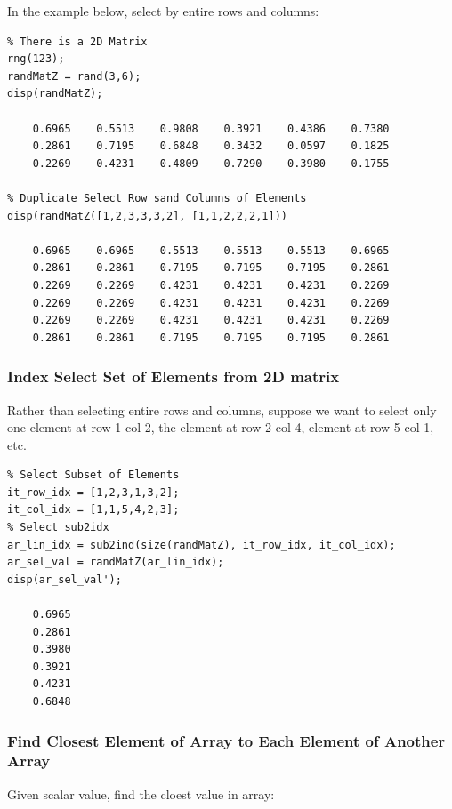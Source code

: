 \documentclass[
]{book}
\begin{document}
In the example below, select by entire rows and columns:

\begin{verbatim}
% There is a 2D Matrix
rng(123);
randMatZ = rand(3,6);
disp(randMatZ);

    0.6965    0.5513    0.9808    0.3921    0.4386    0.7380
    0.2861    0.7195    0.6848    0.3432    0.0597    0.1825
    0.2269    0.4231    0.4809    0.7290    0.3980    0.1755

% Duplicate Select Row sand Columns of Elements
disp(randMatZ([1,2,3,3,3,2], [1,1,2,2,2,1]))

    0.6965    0.6965    0.5513    0.5513    0.5513    0.6965
    0.2861    0.2861    0.7195    0.7195    0.7195    0.2861
    0.2269    0.2269    0.4231    0.4231    0.4231    0.2269
    0.2269    0.2269    0.4231    0.4231    0.4231    0.2269
    0.2269    0.2269    0.4231    0.4231    0.4231    0.2269
    0.2861    0.2861    0.7195    0.7195    0.7195    0.2861
\end{verbatim}

\hypertarget{index-select-set-of-elements-from-2d-matrix}{%
\subsubsection{Index Select Set of Elements from 2D matrix}\label{index-select-set-of-elements-from-2d-matrix}}

Rather than selecting entire rows and columns, suppose we want to select
only one element at row 1 col 2, the element at row 2 col 4, element at
row 5 col 1, etc.

\begin{verbatim}
% Select Subset of Elements
it_row_idx = [1,2,3,1,3,2];
it_col_idx = [1,1,5,4,2,3];
% Select sub2idx
ar_lin_idx = sub2ind(size(randMatZ), it_row_idx, it_col_idx);
ar_sel_val = randMatZ(ar_lin_idx);
disp(ar_sel_val');

    0.6965
    0.2861
    0.3980
    0.3921
    0.4231
    0.6848
\end{verbatim}

\hypertarget{find-closest-element-of-array-to-each-element-of-another-array}{%
\subsubsection{Find Closest Element of Array to Each Element of Another Array}\label{find-closest-element-of-array-to-each-element-of-another-array}}

Given scalar value, find the cloest value in array:
\end{document}
